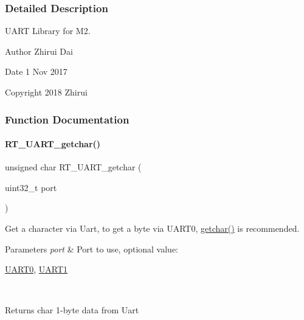 \subsubsection{Detailed Description}
U\+A\+RT Library for M2. 

\begin{DoxyAuthor}{Author}
Zhirui Dai 
\end{DoxyAuthor}
\begin{DoxyDate}{Date}
1 Nov 2017 
\end{DoxyDate}
\begin{DoxyCopyright}{Copyright}
2018 Zhirui 
\end{DoxyCopyright}


\subsubsection{Function Documentation}
\mbox{\label{a00170_abc136df9d66fe27bf8ffcc319246591e}} 
\paragraph{\texorpdfstring{R\+T\+\_\+\+U\+A\+R\+T\+\_\+getchar()}{RT\_UART\_getchar()}}
{\footnotesize\ttfamily unsigned char R\+T\+\_\+\+U\+A\+R\+T\+\_\+getchar (\begin{DoxyParamCaption}\item[{uint32\+\_\+t}]{port }\end{DoxyParamCaption})}



Get a character via Uart, to get a byte via U\+A\+R\+T0, \mbox{\hyperlink{a00095_a0979671914792955a7a68461634ff82d}{getchar()}} is recommended. 


\begin{DoxyParams}{Parameters}
{\em port} & Port to use, optional value\+:
\begin{DoxyCode}
\mbox{\hyperlink{a00173_a0508661f121639ffdee7de2353a0def2}{UART0}}, \mbox{\hyperlink{a00173_a8d69bf04d07af4fbbab5a8bd291f65ff}{UART1}}
\end{DoxyCode}
 \\
\hline
\end{DoxyParams}
\begin{DoxyReturn}{Returns}
char 1-\/byte data from Uart 
\end{DoxyReturn}
\mbox{\label{a00170_ab0faf051e642e540b1b9c114eae242bd}} 
